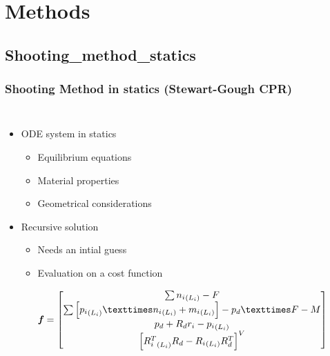 \documentclass[compress]{thesisbeamer}
\begin{document}
	\section{Methods}	
		\subsection{Shooting_method_statics}
        \begin{frame}
        	\frametitle{Shooting Method in statics (Stewart-Gough CPR)}
        	\begin{columns}
			\begin{itemize}%
  				\item ODE system in statics
  				\begin{itemize}
  					\item Equilibrium equations
  					\item Material properties
  					\item Geometrical considerations
  				\end{itemize}
  				\item Recursive solution
  				\begin{itemize}
  					\item Needs an intial guess
  					\item Evaluation on a cost function  
  					\begin{fleqn}
  					\begin{equation}
  						\textbf{\textit{f}} = 
  						\begin{bmatrix}
  							\sum{ {{n}_{i}}_{\left({L}_{i} \right)} }- F \\
  							\sum{ \left[{{p}_{i}}_{\left({L}_{i} \right)} × {{n}_{i}}_{\left({L}_{i} \right)} + {{m}_{i}}_{\left({L}_{i} \right)} \right] } - {p}_{d} × F-M \\
  							{p}_{d} + {R}_{d} {r}_{i} - {{p}_{i}}_{\left({L}_{i} \right)} \\
  							{\left[{{R}_{i}^{T}}_{\left({L}_{i} \right)} {R}_{d} - {{R}_{i}}_{\left({L}_{i} \right)} {R}_{d}^{T} \right]}^{V} 
  						\end{bmatrix}
  					\end{equation}\vfill
  					\end{fleqn}
  				\end{itemize}
 			\end{itemize}
			\begin{figure}[h]
				\centering

\end{figure}
\end{columns}
\end{frame}
\end{document}

